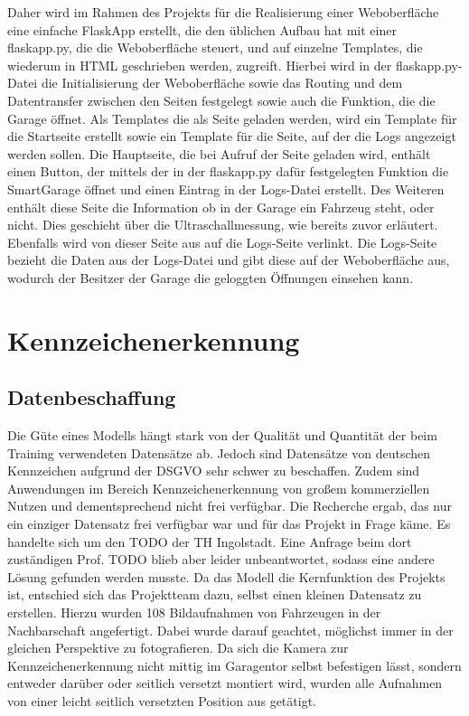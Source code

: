 Daher wird im Rahmen des Projekts für die Realisierung einer Weboberfläche eine einfache FlaskApp erstellt, die den üblichen Aufbau hat mit einer flaskapp.py, die die Weboberfläche steuert, und auf einzelne Templates, die wiederum in HTML geschrieben werden, zugreift. Hierbei wird in der flaskapp.py-Datei die Initialisierung der Weboberfläche sowie das Routing und dem Datentransfer zwischen den Seiten festgelegt sowie auch die Funktion, die die Garage öffnet. Als Templates die als Seite geladen werden, wird ein Template für die Startseite erstellt sowie ein Template für die Seite, auf der die Logs angezeigt werden sollen. Die Hauptseite, die bei Aufruf der Seite geladen wird, enthält einen Button, der mittels der in der flaskapp.py dafür festgelegten Funktion die SmartGarage öffnet und einen Eintrag in der Logs-Datei erstellt. Des Weiteren enthält diese Seite die Information ob in der Garage ein Fahrzeug steht, oder nicht. Dies geschieht über die Ultraschallmessung, wie bereits zuvor erläutert. Ebenfalls wird von dieser Seite aus auf die Logs-Seite verlinkt. Die Logs-Seite bezieht die Daten aus der Logs-Datei und gibt diese auf der Weboberfläche aus, wodurch der Besitzer der Garage die geloggten Öffnungen einsehen kann.

\nocite{*}

\chapter{Kennzeichenerkennung}

\section{Datenbeschaffung}
Die Güte eines Modells hängt stark von der Qualität und Quantität der beim Training verwendeten Datensätze ab. Jedoch sind Datensätze von deutschen Kennzeichen aufgrund der \ac{DSGVO} sehr schwer zu beschaffen. Zudem sind Anwendungen im Bereich Kennzeichenerkennung von großem kommerziellen Nutzen und dementsprechend nicht frei verfügbar. Die Recherche ergab, das nur ein einziger Datensatz frei verfügbar war und für das Projekt in Frage käme. Es handelte sich um den TODO der TH Ingolstadt. Eine Anfrage beim dort zuständigen Prof. TODO blieb aber leider unbeantwortet, sodass eine andere Lösung gefunden werden musste.
Da das Modell die Kernfunktion des Projekts ist, entschied sich das Projektteam dazu, selbst einen kleinen Datensatz zu erstellen. 
Hierzu wurden 108 Bildaufnahmen von Fahrzeugen in der Nachbarschaft angefertigt. Dabei wurde darauf geachtet, möglichst immer in der gleichen Perspektive zu fotografieren. Da sich die Kamera zur Kennzeichenerkennung nicht mittig im Garagentor selbst befestigen lässt, sondern entweder darüber oder seitlich versetzt montiert wird, wurden alle Aufnahmen von einer leicht seitlich versetzten Position aus getätigt.

